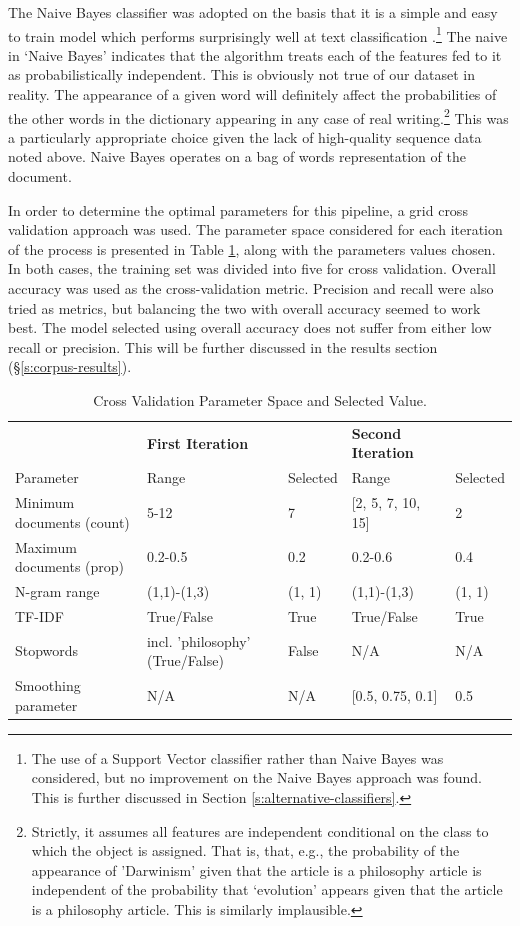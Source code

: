 \documentclass{article}
\begin{document}
The Naive Bayes classifier was adopted on the basis that it is a simple and easy to train model which performs surprisingly well at text classification \cite{zhang-2004}.\footnote{The use of a Support Vector classifier rather than Naive Bayes was considered, but no improvement on the Naive Bayes approach was found. This is further discussed in Section \ref{s:alternative-classifiers}.} The naive in `Naive Bayes' indicates that the algorithm treats each of the features fed to it as probabilistically independent. This is obviously not true of our dataset in reality. The appearance of a given word will definitely affect the probabilities of the other words in the dictionary appearing in any case of real writing.\footnote{Strictly, it assumes all features are independent conditional on the class to which the object is assigned. That is, that, e.g., the probability of the appearance of 'Darwinism' given that the article is a philosophy article is independent of the probability that `evolution' appears given that the article is a philosophy article. This is similarly implausible.} This was a particularly appropriate choice given the lack of high-quality sequence data noted above. Naive Bayes operates on a bag of words representation of the document. %

In order to determine the optimal parameters for this pipeline, a grid cross validation approach was used. The parameter space considered for each iteration of the process is presented in Table \ref{t:CV}, along with the parameters values chosen. In both cases, the training set was divided into five for cross validation. Overall accuracy was used as the cross-validation metric. Precision and recall were also tried as metrics, but balancing the two with overall accuracy seemed to work best. The model selected using overall accuracy does not suffer from either low recall or precision. This will be further discussed in the results section (\S \ref{s:corpus-results}).

\begin{table}[]
        \centering
        \footnotesize
        \begin{tabular}{l|ll|ll}
           & \textbf{First Iteration} & & \textbf{Second Iteration} & \\
          Parameter & Range & Selected & Range & Selected \\
          \hline
          Minimum documents (count) & 5-12 & 7 & [2, 5, 7, 10, 15] & 2 \\ %
          Maximum documents (prop) & 0.2-0.5 & 0.2 & 0.2-0.6 & 0.4 \\
          N-gram range & (1,1)-(1,3) & (1, 1) & (1,1)-(1,3) & (1, 1) \\
          TF-IDF & True/False & True & True/False & True \\
          Stopwords & incl. 'philosophy' (True/False) & False & N/A & N/A \\
          Smoothing parameter& N/A & N/A & [0.5, 0.75, 0.1] & 0.5
        \end{tabular}
        \caption{Cross Validation Parameter Space and Selected Value.}
        \label{t:CV}
\end{table}
\end{document}
